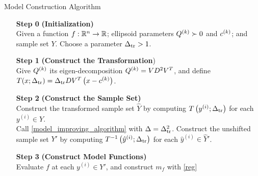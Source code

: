 \documentclass{article}
\begin{document}
{
\begin{fullwidth}[leftmargin=0in, rightmargin=0in, width=\linewidth-0.5in]
\begin{flushleft}

\begin{algorithm}[H]
    \caption{Model Construction Algorithm}
    \label{model_construction_algorithm}
    \begin{itemize}
        \item[\textbf{Step 0}] \textbf{(Initialization)} \\
			Given a function $f : \mathbb R^n \to \mathbb R$;
			ellipsoid parameters ${Q^{(k)}} \succ 0$ and $c^{(k)}$;
        	and sample set $Y$.
        	Choose a parameter $\Delta_{\textrm{tr}} > 1$.
        \item[\textbf{Step 1}] \textbf{(Construct the Transformation}) \\
        	Give ${Q^{(k)}}$ its eigen-decomposition ${Q^{(k)}} = VD^2V^T$, and define
			$T(x; \Delta_{\textrm{tr}}) = \Delta_{\textrm{tr}} D V^T\left(x - c^{(k)}\right)$.
        \item[\textbf{Step 2}] \textbf{(Construct the Sample Set)} \\
        Construct the transformed sample set $\hat Y$ by computing $T\left(y^{(i)}; \Delta_{\textrm{tr}}\right)$ for each $y^{(i)} \in Y$. \\
        Call \cref{model_improving_algorithm} with $\Delta = \Delta_{\textrm{tr}}^2$.
        Construct the unshifted sample set $Y'$ by computing $T^{-1}\left(\hat y^{(i)}; \Delta_{\textrm{tr}}\right)$ for each $\hat y^{(i)} \in \hat Y'$.
        \item[\textbf{Step 3}] \textbf{(Construct Model Functions)} \\
        Evaluate $f$ at each $y^{(i)} \in Y'$, and construct $m_f$ with \cref{reg}
    \end{itemize}
\end{algorithm}


\end{flushleft}
\end{fullwidth}
}
\end{document}
